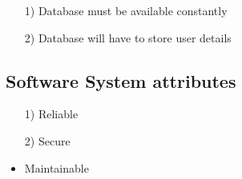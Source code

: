 \documentclass[10pt,a4paper]{article}
\begin{document}
\begin{itemize}

\item[1)]
Database must be available constantly

\item[2)]
Database will have to store user details

\end{itemize}



\subsection{Software System attributes}

\begin{itemize}
\item[1)]
Reliable
\item[2)]
Secure
\item
Maintainable
\end{itemize}
\end{document}
